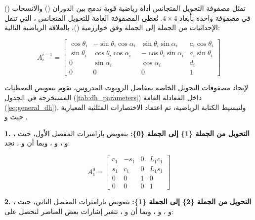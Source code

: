 \section{}

\label{sec:transformation}

تمثل مصفوفة التحويل المتجانس أداة رياضية قوية تدمج بين الدوران () والانسحاب () في مصفوفة واحدة بأبعاد $4 \times 4$. تُعطى المصفوفة العامة للتحويل المتجانس ، التي تنقل الإحداثيات من الجملة  إلى الجملة  وفق خوارزمية ()، بالعلاقة الرياضية التالية:

\begin{equation}
A_i^{i-1} = 
\begin{bmatrix}
\cos\theta_i & -\sin\theta_i \cos\alpha_i & \sin\theta_i \sin\alpha_i & a_i \cos\theta_i \\
\sin\theta_i & \cos\theta_i \cos\alpha_i & -\cos\theta_i \sin\alpha_i & a_i \sin\theta_i \\
0 & \sin\alpha_i & \cos\alpha_i & d_i \\
0 & 0 & 0 & 1
\end{bmatrix}
\label{eq:general_dh}
\end{equation}

لإيجاد مصفوفات التحويل الخاصة بمفاصل الروبوت المدروس، نقوم بتعويض المعطيات المستخرجة في الجدول (\ref{tab:dh_parameters}) داخل المعادلة العامة (\ref{eq:general_dh}). ولتبسيط الكتابة الرياضية، تم اعتماد الاختصارات المثلثية المعيارية حيث  و .

\textbf{1. التحويل من الجملة \{1\} إلى الجملة \{0\}:}
بتعويض بارامترات المفصل الأول، حيث ، و ، و ، وبما أن  و ، نجد:

\begin{equation}
A_1^0 = 
\begin{bmatrix}
c_1 & -s_1 & 0 & L_1 c_1 \\
s_1 & c_1 & 0 & L_1 s_1 \\
0 & 0 & 1 & 0 \\
0 & 0 & 0 & 1
\end{bmatrix}
\label{eq:A10}
\end{equation}

\textbf{2. التحويل من الجملة \{2\} إلى الجملة \{1\}:}
بتعويض بارامترات المفصل الثاني، حيث ، و ، و ، وبما أن  و ، تتغير إشارات بعض العناصر لنحصل على:

